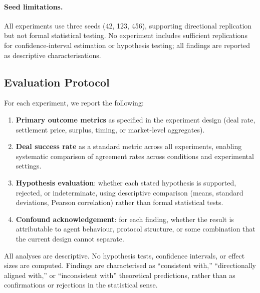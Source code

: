 \paragraph{Seed limitations.}
All experiments use three seeds (42, 123, 456), supporting directional replication but not formal statistical testing.  No experiment includes sufficient replications for confidence-interval estimation or hypothesis testing; all findings are reported as descriptive characterisations.


\subsection{Evaluation Protocol}
\label{sec:eval-protocol}

For each experiment, we report the following:

\begin{enumerate}
    \item \textbf{Primary outcome metrics} as specified in the experiment design (deal rate, settlement price, surplus, timing, or market-level aggregates).
    \item \textbf{Deal success rate} as a standard metric across all experiments, enabling systematic comparison of agreement rates across conditions and experimental settings.
    \item \textbf{Hypothesis evaluation}: whether each stated hypothesis is supported, rejected, or indeterminate, using descriptive comparison (means, standard deviations, Pearson correlation) rather than formal statistical tests.
    \item \textbf{Confound acknowledgement}: for each finding, whether the result is attributable to agent behaviour, protocol structure, or some combination that the current design cannot separate.
\end{enumerate}

All analyses are descriptive.  No hypothesis tests, confidence intervals, or effect sizes are computed.  Findings are characterised as ``consistent with,'' ``directionally aligned with,'' or ``inconsistent with'' theoretical predictions, rather than as confirmations or rejections in the statistical sense.
